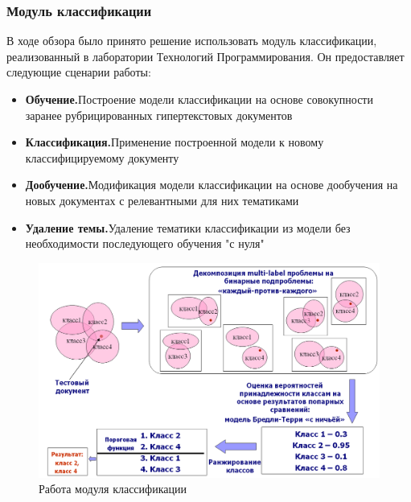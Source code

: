 \documentclass[russian, utf8, emptystyle]{eskdtext}
\begin{document}
\subsubsection{Модуль классификации}
В ходе обзора было принято решение использовать модуль классификации, реализованный в лаборатории Технологий Программирования. Он предоставляет следующие сценарии работы:
\begin{itemize}
	\item {\bf Обучение.}Построение модели классификации на основе совокупности заранее рубрицированных гипертекстовых документов
	
	\item {\bf Классификация.}Применение построенной модели к новому классифицируемому документу
	\item {\bf Дообучение.}Модификация модели классификации на основе дообучения на новых документах с релевантными для них тематиками
	\item {\bf Удаление темы.}Удаление тематики классификации из модели без необходимости последующего обучения "с нуля"
\end{itemize}
\begin{figure}[h]
	\begin{center}
		\includegraphics[width=14cm]{pic/module.png}
		\caption{Работа модуля классификации}
		\label{fig:low_sigma}
	\end{center}
\end{figure}
\end{document}

